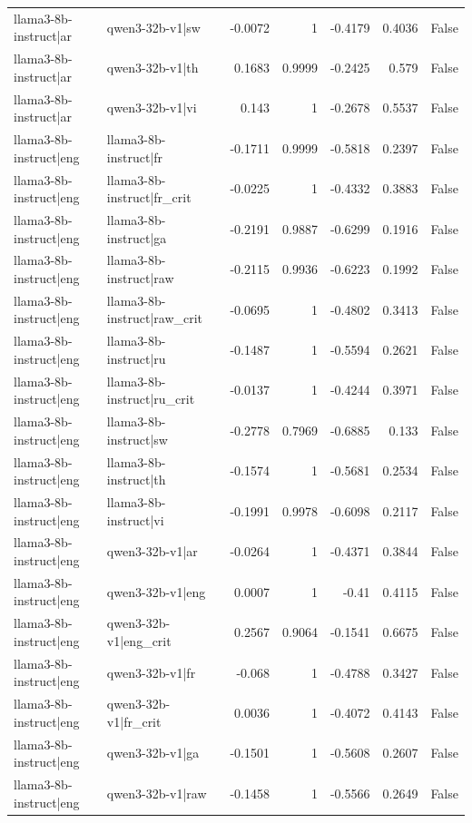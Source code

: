 \begin{table}
\begin{tabular}{l l r r r r l}
llama3-8b-instruct|ar & qwen3-32b-v1|sw & -0.0072 & 1 & -0.4179 & 0.4036 & False \\
llama3-8b-instruct|ar & qwen3-32b-v1|th & 0.1683 & 0.9999 & -0.2425 & 0.579 & False \\
llama3-8b-instruct|ar & qwen3-32b-v1|vi & 0.143 & 1 & -0.2678 & 0.5537 & False \\
llama3-8b-instruct|eng & llama3-8b-instruct|fr & -0.1711 & 0.9999 & -0.5818 & 0.2397 & False \\
llama3-8b-instruct|eng & llama3-8b-instruct|fr_crit & -0.0225 & 1 & -0.4332 & 0.3883 & False \\
llama3-8b-instruct|eng & llama3-8b-instruct|ga & -0.2191 & 0.9887 & -0.6299 & 0.1916 & False \\
llama3-8b-instruct|eng & llama3-8b-instruct|raw & -0.2115 & 0.9936 & -0.6223 & 0.1992 & False \\
llama3-8b-instruct|eng & llama3-8b-instruct|raw_crit & -0.0695 & 1 & -0.4802 & 0.3413 & False \\
llama3-8b-instruct|eng & llama3-8b-instruct|ru & -0.1487 & 1 & -0.5594 & 0.2621 & False \\
llama3-8b-instruct|eng & llama3-8b-instruct|ru_crit & -0.0137 & 1 & -0.4244 & 0.3971 & False \\
llama3-8b-instruct|eng & llama3-8b-instruct|sw & -0.2778 & 0.7969 & -0.6885 & 0.133 & False \\
llama3-8b-instruct|eng & llama3-8b-instruct|th & -0.1574 & 1 & -0.5681 & 0.2534 & False \\
llama3-8b-instruct|eng & llama3-8b-instruct|vi & -0.1991 & 0.9978 & -0.6098 & 0.2117 & False \\
llama3-8b-instruct|eng & qwen3-32b-v1|ar & -0.0264 & 1 & -0.4371 & 0.3844 & False \\
llama3-8b-instruct|eng & qwen3-32b-v1|eng & 0.0007 & 1 & -0.41 & 0.4115 & False \\
llama3-8b-instruct|eng & qwen3-32b-v1|eng_crit & 0.2567 & 0.9064 & -0.1541 & 0.6675 & False \\
llama3-8b-instruct|eng & qwen3-32b-v1|fr & -0.068 & 1 & -0.4788 & 0.3427 & False \\
llama3-8b-instruct|eng & qwen3-32b-v1|fr_crit & 0.0036 & 1 & -0.4072 & 0.4143 & False \\
llama3-8b-instruct|eng & qwen3-32b-v1|ga & -0.1501 & 1 & -0.5608 & 0.2607 & False \\
llama3-8b-instruct|eng & qwen3-32b-v1|raw & -0.1458 & 1 & -0.5566 & 0.2649 & False \\

\end{tabular}
\end{table}
